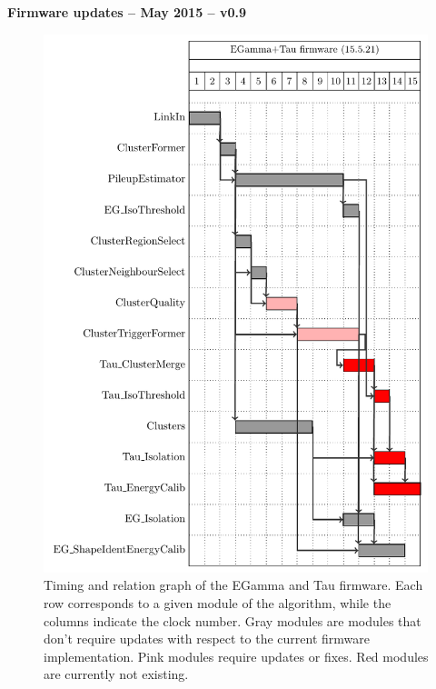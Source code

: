 \documentclass[a4paper, 12pt]{article}
\begin{document}
\renewcommand{\contentsname}{}


\begin{center}
{\LARGE \bf Firmware updates -- May 2015 -- v0.9}\\
\end{center}


\begin{figure}[hbtp]
  \begin{center}
    \includegraphics[width=11.2cm]{./gantt_charts/firmware_egAndTau_mod.pdf}
    \caption{Timing and relation graph of the EGamma and Tau firmware. Each row corresponds to a given module of the algorithm, while the columns indicate the clock number. Gray modules are modules that don't require updates with respect to the current firmware implementation. Pink modules require updates or fixes. Red modules are currently not existing.}
    \label{fig:gantt}
  \end{center}
\end{figure}
\end{document}
